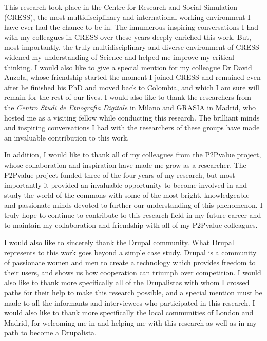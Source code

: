 This research took place in the Centre for Research and Social Simulation (CRESS), the most multidisciplinary and international working environment I have ever had the chance to be in. The innumerous inspiring conversations I had with my colleagues in CRESS over these years deeply enriched this work. But, most importantly, the truly multidisciplinary and diverse environment of CRESS widened my understanding of Science and helped me improve my critical thinking. I would also like to give a special mention for my colleague Dr David Anzola, whose friendship started the moment I joined CRESS and remained even after he finished his PhD and moved back to Colombia, and which I am sure will remain for the rest of our lives. I would also like to thank the researchers from the \textit{Centro Studi de Etnografia Digitale} in Milano and GRASIA in Madrid, who hosted me as a visiting fellow while conducting this research. The brilliant minds and inspiring conversations I had with the researchers of these groups have made an invaluable contribution to this work.

In addition, I would like to thank all of my colleagues from the P2Pvalue project, whose collaboration and inspiration have made me grow as a researcher. The P2Pvalue project funded three of the four years of my research, but most importantly it provided an invaluable opportunity to become involved in and study the world of the commons with some of the most bright, knowledgeable and passionate minds devoted to further our understanding of this phenomenon. I truly hope to continue to contribute to this research field in my future career and to maintain my collaboration and friendship with all of my P2Pvalue colleagues.

I would also like to sincerely thank the Drupal community. What Drupal represents to this work goes beyond a simple case study. Drupal is a community of passionate women and men to create a technology which provides freedom to their users, and shows us how cooperation can triumph over competition. I would also like to thank more specifically all of the Drupalistas with whom I crossed paths for their help to make this research possible, and a special mention must be made to all the informants and interviewees who participated in this research. I would also like to thank more specifically the local communities of London and Madrid, for welcoming me in and helping me with this research as well as in my path to become a Drupalista.

